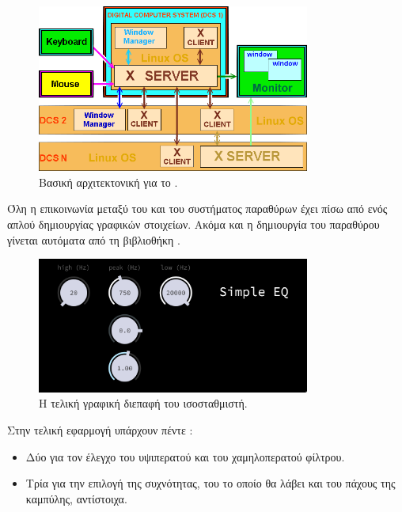 \documentclass[12pt]{extarticle}
\begin{document}
\begin{figure}[h]
    \centering
    \includegraphics[width=0.8\textwidth]{./assets/xserver.png}
    \caption{Βασική αρχιτεκτονική  για το .}
    \label{fig:}
\end{figure}

Όλη η επικοινωνία μεταξύ του  και του συστήματος 
παραθύρων έχει  πίσω από ενός απλού  
δημιουργίας γραφικών στοιχείων. Ακόμα και η δημιουργία 
του παραθύρου γίνεται αυτόματα από τη βιβλιοθήκη .

\begin{figure}[!htb]
    \centering
    \includegraphics[width=0.8\textwidth]{./assets/GUI.png}
    \caption{Η τελική γραφική διεπαφή του ισοσταθμιστή.}
    \label{fig:finalgui}
\end{figure}

Στην τελική εφαρμογή υπάρχουν πέντε :

\begin{itemize}
    \item Δύο για τον έλεγχο του υψιπερατού και του χαμηλοπερατού φίλτρου.
    \item Τρία για την επιλογή της  συχνότητας, του  το οποίο θα λάβει και του πάχους της καμπύλης, αντίστοιχα.
\end{itemize}
\end{document}

